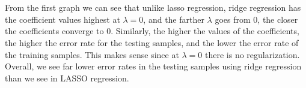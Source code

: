 \documentclass[paper=a4, fontsize=11pt]{scrartcl} %
\numberwithin{equation}{section} %
\numberwithin{figure}{section} %
\numberwithin{table}{section} %
\begin{document}
	\\\\
	From the first graph we can see that unlike lasso regression, ridge regression has the coefficient values highest at $\lambda=0$, and the farther $\lambda$ goes from 0, the closer the coefficients converge to 0. Similarly, the higher the values of the coefficients, the higher the error rate for the testing samples, and the lower the error rate of the training samples. This makes sense since at $\lambda=0$ there is no regularization. Overall, we see far lower error rates in the testing samples using ridge regression than we see in LASSO regression.
	
	
\end{document}
